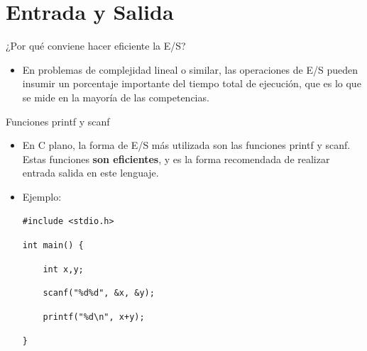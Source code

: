 \documentclass{beamer}
\begin{document}
\section{Entrada y Salida}
\begin{frame}{¿Por qué conviene hacer eficiente la E/S?}
    \begin{itemize}
    \item En problemas de complejidad lineal o similar, las operaciones de E/S pueden insumir un porcentaje importante del tiempo total de ejecución, que es lo que se mide en la mayoría de las competencias.
    \pause
    \end{itemize}
    
  \end{frame}
  
  
  \begin{frame}{Funciones printf y scanf}
  
    \begin{itemize}
        \item En C plano, la forma de E/S más utilizada son las funciones printf y scanf. Estas funciones \textbf{son eficientes}, y es la forma recomendada de realizar entrada salida en este lenguaje.
        \item Ejemplo:
        
  \texttt{\#include <stdio.h>}
  
  \texttt{int main() \{}
  
  \texttt{    \ \ \ int x,y;}
      
  \texttt{    \ \ \ scanf("\%d\%d", \&x, \&y);}
      
  \texttt{    \ \ \ printf("\%d\textbackslash n", x+y);}
      
  \texttt{\}}
    \end{itemize}
    
  \end{frame}
    
\end{document}
